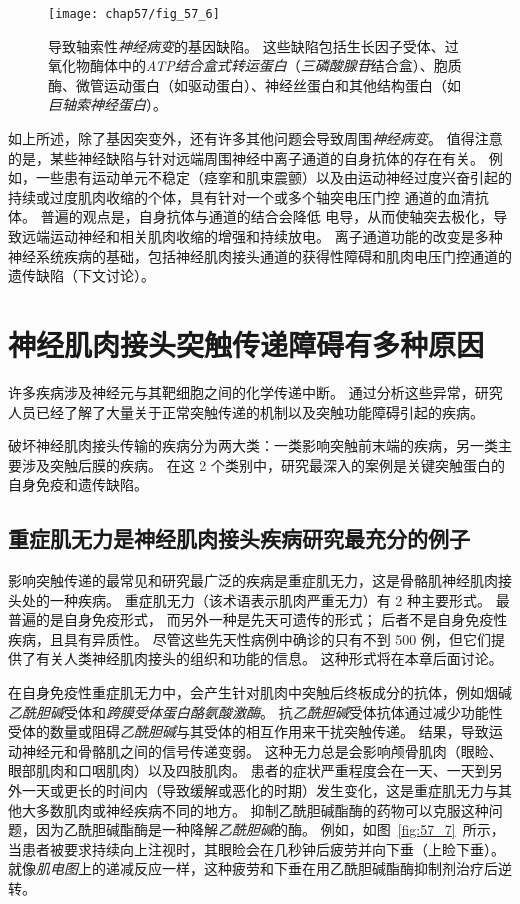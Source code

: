 \begin{figure}[htbp]
	\centering
	\texttt{[image: chap57/fig\_57\_6]}
	\caption{导致轴索性\textit{神经病变}的基因缺陷。
		这些缺陷包括生长因子受体、过氧化物酶体中的\textit{ATP结合盒式转运蛋白}（\textit{三磷酸腺苷}结合盒）、胞质酶、微管运动蛋白（如驱动蛋白）、神经丝蛋白和其他结构蛋白（如\textit{巨轴索神经蛋白}）\cite{brown2002inherited}。}
	\label{fig:57_6}
\end{figure}


如上所述，除了基因突变外，还有许多其他问题会导致周围\textit{神经病变}。
值得注意的是，某些神经缺陷与针对远端周围神经中离子通道的自身抗体的存在有关。
例如，一些患有运动单元不稳定（痉挛和肌束震颤）以及由运动神经过度兴奋引起的持续或过度肌肉收缩的个体，具有针对一个或多个轴突电压门控  通道的血清抗体。
普遍的观点是，自身抗体与通道的结合会降低  电导，从而使轴突去极化，导致远端运动神经和相关肌肉收缩的增强和持续放电。
离子通道功能的改变是多种神经系统疾病的基础，包括神经肌肉接头通道的获得性障碍和肌肉电压门控通道的遗传缺陷（下文讨论）。



\section{神经肌肉接头突触传递障碍有多种原因}

许多疾病涉及神经元与其靶细胞之间的化学传递中断。
通过分析这些异常，研究人员已经了解了大量关于正常突触传递的机制以及突触功能障碍引起的疾病。


破坏神经肌肉接头传输的疾病分为两大类：一类影响突触前末端的疾病，另一类主要涉及突触后膜的疾病。
在这 2 个类别中，研究最深入的案例是关键突触蛋白的自身免疫和遗传缺陷。



\subsection{重症肌无力是神经肌肉接头疾病研究最充分的例子}

影响突触传递的最常见和研究最广泛的疾病是重症肌无力，这是骨骼肌神经肌肉接头处的一种疾病。
重症肌无力（该术语表示肌肉严重无力）有 2 种主要形式。
最普遍的是自身免疫形式，
而另外一种是先天可遗传的形式；
后者不是自身免疫性疾病，且具有异质性。
尽管这些先天性病例中确诊的只有不到 500 例，但它们提供了有关人类神经肌肉接头的组织和功能的信息。
这种形式将在本章后面讨论。


在自身免疫性重症肌无力中，会产生针对肌肉中突触后终板成分的抗体，例如烟碱\textit{乙酰胆碱}受体和\textit{跨膜受体蛋白酪氨酸激酶}。
抗\textit{乙酰胆碱}受体抗体通过减少功能性受体的数量或阻碍\textit{乙酰胆碱}与其受体的相互作用来干扰突触传递。
结果，导致运动神经元和骨骼肌之间的信号传递变弱。
这种无力总是会影响颅骨肌肉（眼睑、眼部肌肉和口咽肌肉）以及四肢肌肉。
患者的症状严重程度会在一天、一天到另外一天或更长的时间内（导致缓解或恶化的时期）发生变化，这是重症肌无力与其他大多数肌肉或神经疾病不同的地方。
抑制乙酰胆碱酯酶的药物可以克服这种问题，因为乙酰胆碱酯酶是一种降解\textit{乙酰胆碱}的酶。
例如，如图~\ref{fig:57_7}~所示，当患者被要求持续向上注视时，其眼睑会在几秒钟后疲劳并向下垂（上睑下垂）。
就像\textit{肌电图}上的递减反应一样，这种疲劳和下垂在用乙酰胆碱酯酶抑制剂治疗后逆转。


